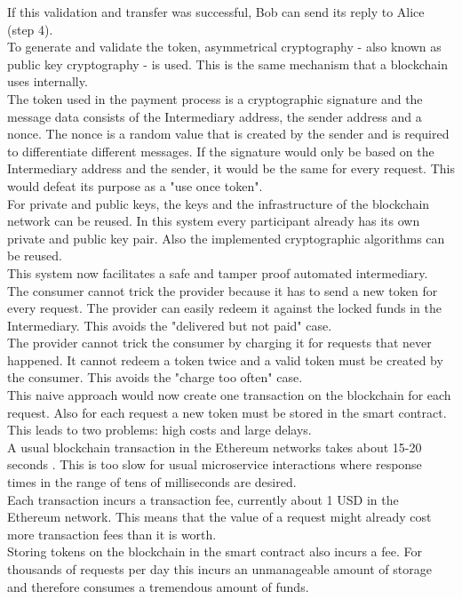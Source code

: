 \documentclass[a4paper,12pt]{scrartcl}
\begin{document}
If this validation and transfer was successful, Bob can send its reply to Alice (step 4).\\

To generate and validate the token, asymmetrical cryptography - also known as public key cryptography \cite{salomaa2013public} - is used. This is the same mechanism that a blockchain uses internally.\\
The token used in the payment process is a cryptographic signature and the message data consists of the Intermediary address, the sender address and a nonce. The nonce is a random value that is created by the sender and is required to differentiate different messages. If the signature would only be based on the Intermediary address and the sender, it would be the same for every request. This would defeat its purpose as a "use once token".\\

For private and public keys, the keys and the infrastructure of the blockchain network can be reused. In this system every participant already has its own private and public key pair. Also the implemented cryptographic algorithms can be reused.\\

This system now facilitates a safe and tamper proof automated intermediary.\\
The consumer cannot trick the provider because it has to send a new token for every request. The provider can easily redeem it against the locked funds in the Intermediary. This avoids the "delivered but not paid" case.\\
The provider cannot trick the consumer by charging it for requests that never happened. It cannot redeem a token twice and a valid token must be created by the consumer. This avoids the "charge too often" case.\\

This naive approach would now create one transaction on the blockchain for each request. Also for each request a new token must be stored in the smart contract. This leads to two problems: high costs and large delays.\\

A usual blockchain transaction in the Ethereum networks takes about 15-20 seconds \cite{web12}. This is too slow for usual microservice interactions where response times in the range of tens of milliseconds are desired.\\
Each transaction incurs a transaction fee, currently about 1 USD \cite{web11} in the Ethereum network. This means that the value of a request might already cost more transaction fees than it is worth.\\
Storing tokens on the blockchain in the smart contract also incurs a fee. For thousands of requests per day this incurs an unmanageable amount of storage and therefore consumes a tremendous amount of funds.\\
\end{document}
